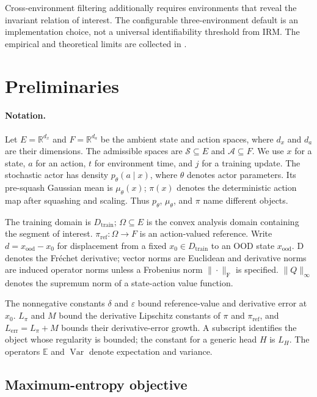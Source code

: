 \documentclass[10pt]{article}
\begin{document}
Cross-environment filtering additionally requires environments that reveal the invariant relation of interest. The configurable three-environment default is an implementation choice, not a universal identifiability threshold from IRM. The empirical and theoretical limits are collected in .

\section{Preliminaries}
\label{sec:preliminaries}

\paragraph{Notation.}
Let $E=\mathbb{R}^{d_x}$ and $F=\mathbb{R}^{d_a}$ be the ambient state and action spaces, where $d_x$ and $d_a$ are their dimensions. The admissible spaces are $\mathcal{S}\subseteq E$ and $\mathcal{A}\subseteq F$. We use $x$ for a state, $a$ for an action, $t$ for environment time, and $j$ for a training update. The stochastic actor has density $p_\theta(a\mid x)$, where $\theta$ denotes actor parameters. Its pre-squash Gaussian mean is $\mu_\theta(x)$; $\pi(x)$ denotes the deterministic action map after squashing and scaling. Thus $p_\theta$, $\mu_\theta$, and $\pi$ name different objects.

The training domain is $D_{\mathrm{train}}$; $\Omega\subseteq E$ is the convex analysis domain containing the segment of interest. $\pi_{\mathrm{ref}}:\Omega\to F$ is an action-valued reference. Write $d=x_{\mathrm{ood}}-x_0$ for displacement from a fixed $x_0\in D_{\mathrm{train}}$ to an OOD state $x_{\mathrm{ood}}$. $\mathrm{D}$ denotes the Fr\'echet derivative; vector norms are Euclidean and derivative norms are induced operator norms unless a Frobenius norm $\|\cdot\|_{\mathrm F}$ is specified. $\|Q\|_\infty$ denotes the supremum norm of a state-action value function.

The nonnegative constants $\delta$ and $\varepsilon$ bound reference-value and derivative error at $x_0$. $L_\pi$ and $M$ bound the derivative Lipschitz constants of $\pi$ and $\pi_{\mathrm{ref}}$, and $L_{\mathrm{err}}=L_\pi+M$ bounds their derivative-error growth. A subscript identifies the object whose regularity is bounded; the constant for a generic head $H$ is $L_H$. The operators $\mathbb E$ and $\operatorname{Var}$ denote expectation and variance.

\subsection{Maximum-entropy objective}
\end{document}
